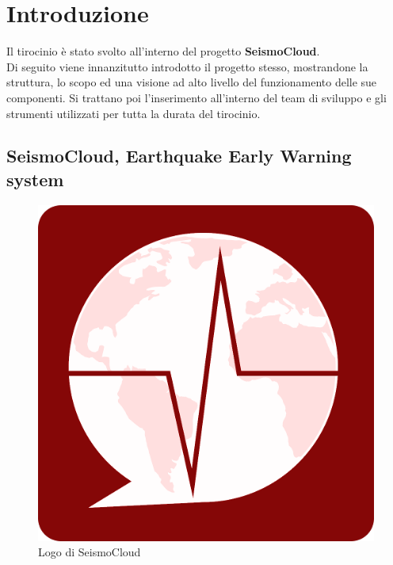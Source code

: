 \chapter{Introduzione}

Il tirocinio è stato svolto all'interno del progetto \textbf{SeismoCloud}.\\
Di seguito viene innanzitutto introdotto il progetto stesso, mostrandone la struttura, lo scopo ed una visione ad alto livello del funzionamento delle sue componenti. Si trattano poi l'inserimento all'interno del team di sviluppo e gli strumenti utilizzati per tutta la durata del tirocinio.


\section{SeismoCloud, Earthquake Early Warning system}

\begin{figure}
    \centering
    \includegraphics[scale=0.15]{images/seismologo.png}
    \caption{Logo di SeismoCloud}
    \label{fig:seismologo}
\end{figure}

